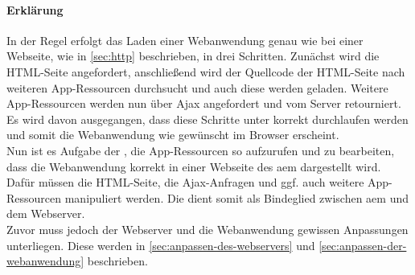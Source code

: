 \paragraph{Erklärung}

In der Regel erfolgt das Laden einer Webanwendung genau wie bei einer Webseite, wie in \autoref{sec:http} beschrieben, in drei Schritten. Zunächst wird die HTML-Seite angefordert, anschließend wird der Quellcode der HTML-Seite nach weiteren App-Ressourcen durchsucht und auch diese werden geladen. Weitere App-Ressourcen werden nun über Ajax angefordert und vom Server retourniert. Es wird davon ausgegangen, dass diese Schritte unter \serverB korrekt durchlaufen werden und somit die Webanwendung wie gewünscht im Browser erscheint. \\
Nun ist es Aufgabe der \ajc, die App-Ressourcen so aufzurufen und zu bearbeiten, dass die Webanwendung korrekt in einer Webseite des \ac{aem} dargestellt wird. Dafür müssen die HTML-Seite, die Ajax-Anfragen und ggf. auch weitere App-Ressourcen manipuliert werden. Die \ajc dient somit als Bindeglied zwischen \ac{aem} und dem Webserver.\\
Zuvor muss jedoch der Webserver und die Webanwendung gewissen Anpassungen unterliegen. Diese werden in \autoref{sec:anpassen-des-webservers} und \autoref{sec:anpassen-der-webanwendung} beschrieben.
